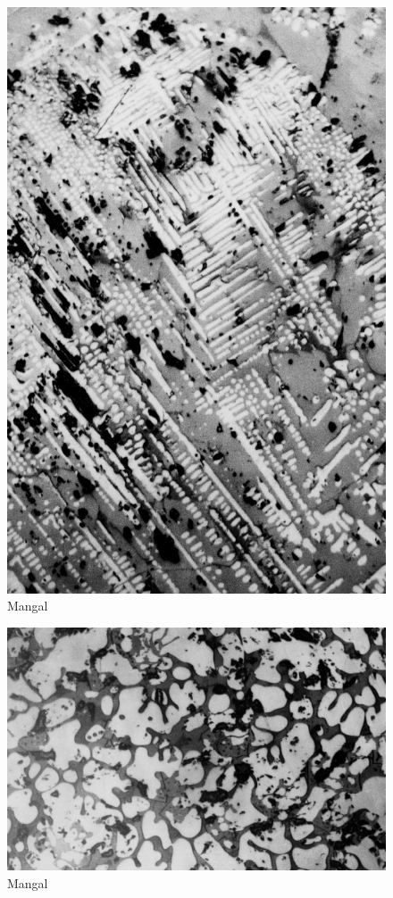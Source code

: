 \newpage

\begin{figure}[H]
\renewcommand{\thefigure}{19B}
\includegraphics[scale=0.65]{images/chapter-4/fig019B.jpg}
\caption{Mangal}\label{chapter-4-fig19B}
\end{figure}
\begin{figure}[H]
\renewcommand{\thefigure}{19C}
\includegraphics[scale=0.65]{images/chapter-4/fig019C.jpg}
\caption{Mangal}\label{chapter-4-fig19C}
\end{figure}

